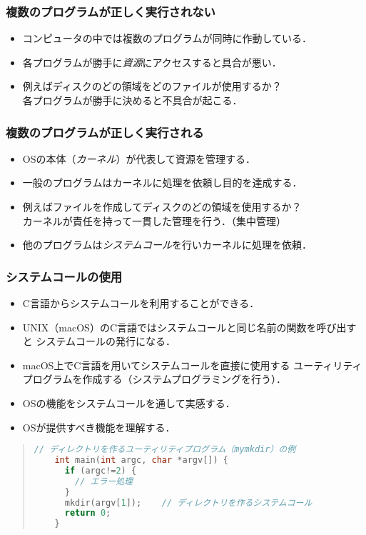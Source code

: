 \documentclass{beamer}                 %
\begin{document}
\begin{frame}
  \frametitle{複数のプログラムが正しく実行されない}
  \begin{itemize}
  \item コンピュータの中では複数のプログラムが同時に作動している．
  \item 各プログラムが勝手に\emph{資源}にアクセスすると具合が悪い．
  \item 例えばディスクのどの領域をどのファイルが使用するか？\\
    各プログラムが勝手に決めると不具合が起こる．
  \end{itemize}
\end{frame}

\begin{frame}
  \frametitle{複数のプログラムが正しく実行される}
  \begin{itemize}
  \item OSの本体（\emph{カーネル}）が代表して資源を管理する．
  \item 一般のプログラムはカーネルに処理を依頼し目的を達成する．
  \item 例えばファイルを作成してディスクのどの領域を使用するか？\\
    カーネルが責任を持って一貫した管理を行う．（集中管理）
  \item 他のプログラムは\emph{システムコール}を行いカーネルに処理を依頼．
  \end{itemize}
\end{frame}

\begin{frame}[fragile]
  \frametitle{システムコールの使用}
  \begin{itemize}
  \item C言語からシステムコールを利用することができる．
  \item UNIX（macOS）のC言語ではシステムコールと同じ名前の関数を呼び出すと
    システムコールの発行になる．
  \item macOS上でC言語を用いてシステムコールを直接に使用する
    ユーティリティプログラムを作成する（システムプログラミングを行う）．
  \item OSの機能をシステムコールを通して実感する．
  \item OSが提供すべき機能を理解する．
  \end{itemize}
  \begin{quote}
\begin{lstlisting}[language=C++]
    // ディレクトリを作るユーティリティプログラム（mymkdir）の例
    int main(int argc, char *argv[]) {
      if (argc!=2) {
        // エラー処理
      }
      mkdir(argv[1]);    // ディレクトリを作るシステムコール
      return 0;
    }
\end{lstlisting}
  \end{quote}
\end{frame}
\end{document}
